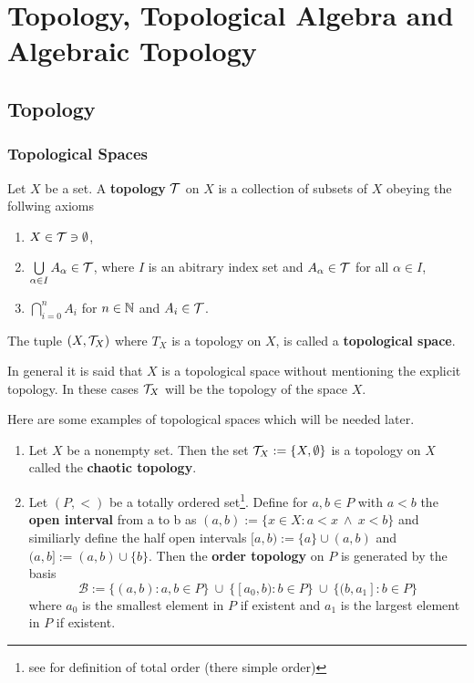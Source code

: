 \section{Topology, Topological Algebra and Algebraic Topology}
\subsection{Topology}

\subsubsection{Topological Spaces}
\begin{defin}
  Let $X$ be a set. A \textbf{topology} $\mathcal{T}$ on $X$ is a collection of subsets of $X$ obeying the follwing axioms
  \begin{enumerate}
    \item $X \in \mathcal{T} \ni \emptyset$,
    \item $\bigcup\limits_{\alpha \in I}A_{\alpha} \in \mathcal{T}$, where $I$ is an abitrary index set and $A_{\alpha} \in \mathcal{T}$ for all $\alpha \in I$,
    \item $\bigcap\limits_{i=0}^n A_i$ for $n \in \mathbb{N}$ and $A_i \in \mathcal{T}$.
  \end{enumerate}
  
  The tuple $(X, \mathcal{T}_X)$ where $T_X$ is a topology on $X$, is called a \textbf{topological space}.
\end{defin}

In general it is said that $X$ is a topological space without mentioning the explicit topology. In these cases $\mathcal{T}_X$ will be the topology of the space $X$.

\begin{defin}
  
\end{defin}

\begin{ex}\label{ex:top}
  Here are some examples of topological spaces which will be needed later.
\begin{enumerate}[label=\textbf{\arabic*.}]
  \item \label{ex:top-chaotic} Let $X$ be a nonempty set. Then the set $\mathcal{T}_X := \{X, \emptyset\}$ is a topology on $X$ called the \textbf{chaotic topology}.
  \item \label{ex:top-order} Let $(P, <)$ be a totally ordered set\footnote{see \cite[p. 24]{MunTop} for definition of total order (there simple order)}. Define for $a, b \in P$ with $a < b$ the \textbf{open interval} from a to b as $(a,b) := \{ x \in X\colon a < x \: \land \: x < b \}$ and similiarly define the half open intervals $[a,b) := \{a\} \cup (a,b)$ and $(a,b] := (a,b) \cup \{ b \}$. 
  Then the \textbf{order topology} on $P$ is generated by the basis
  \begin{equation*}
    \mathcal{B} := \{ (a,b) \colon a, b \in P \} \: \cup \: \{[a_0, b)\colon b \in P\} \: \cup \: \{ (b, a_1]\colon b \in P\}
  \end{equation*}
  where $a_0$ is the smallest element in $P$ if existent and $a_1$ is the largest element in $P$ if existent.
\end{enumerate}
\end{ex}

